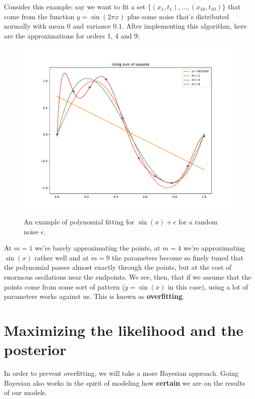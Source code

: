 \documentclass{report}
\begin{document}
Consider this example: say we want to fit a set $\{(x_1, t_1),\dots,(x_{10},t_{10})\}$ that come from the function $y=\sin(2\pi x)$ plus some noise that's distributed normally with mean $0$ and variance $0.1$. After implementing this algorithm, here are the approximations for orders 1, 4 and 9:

\begin{figure}[H]
	\centering
	\includegraphics[width=1\textwidth]{images/overfitting.pdf}
	\caption{An example of polynomial fitting for $\sin(x) + \epsilon$ for a random noise $\epsilon$.}
\end{figure}

At $m=1$ we're barely approximating the points, at $m=4$ we're approximating $\sin(x)$ rather well and at $m=9$ the parameters become so finely tuned that the polynomial passes almost exactly through the points, but at the cost of enormous oscilations near the endpoints. We see, then, that if we assume that the points come from some sort of pattern ($y = \sin(x)$ in this case), using a lot of parameters works against us. This is known as \textbf{overfitting}.

\section{Maximizing the likelihood and the posterior}

In order to prevent overfitting, we will take a more Bayesian approach. Going Bayesian also works in the spirit of modeling how \textbf{certain} we are on the results of our models.
\end{document}
